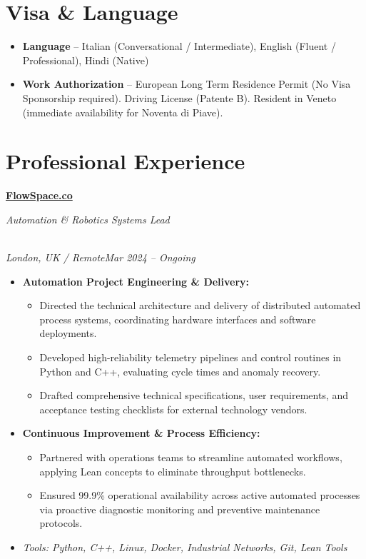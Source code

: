 \documentclass[a4paper,10pt]{article}
\newcommand{\role}[4]{\vspace{3pt}\noindent\hspace{0.6em}\parbox[t]{0.38\textwidth}{\raggedright\textbf{#1}}\hfill\parbox[t]{0.58\textwidth}{\raggedleft\textit{#2}}\\{\textit{#3}\hfill\textit{#4}}\vspace{1pt}}
\begin{document}
\section{Visa \& Language}
\begin{itemize}
\item \textbf{Language} -- Italian (Conversational / Intermediate), English (Fluent / Professional), Hindi (Native)
\item \textbf{Work Authorization} -- European Long Term Residence Permit (No Visa Sponsorship required). Driving License (Patente B). Resident in Veneto (immediate availability for Noventa di Piave).
\end{itemize}

\section{Professional Experience}
\role{\href{https://flowspace.co}{FlowSpace.co}}{Automation \& Robotics Systems Lead}{London, UK / Remote}{Mar 2024 -- Ongoing}
\begin{itemize}
\item \textbf{Automation Project Engineering \& Delivery:}
\begin{itemize}[label=--]
\item Directed the technical architecture and delivery of distributed automated process systems, coordinating hardware interfaces and software deployments.
\item Developed high-reliability telemetry pipelines and control routines in Python and C++, evaluating cycle times and anomaly recovery.
\item Drafted comprehensive technical specifications, user requirements, and acceptance testing checklists for external technology vendors.
\end{itemize}
\item \textbf{Continuous Improvement \& Process Efficiency:}
\begin{itemize}[label=--]
\item Partnered with operations teams to streamline automated workflows, applying Lean concepts to eliminate throughput bottlenecks.
\item Ensured 99.9\% operational availability across active automated processes via proactive diagnostic monitoring and preventive maintenance protocols.
\end{itemize}
\item \textit{Tools: Python, C++, Linux, Docker, Industrial Networks, Git, Lean Tools}
\end{itemize}
\end{document}
